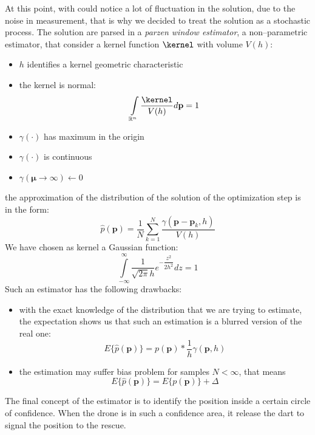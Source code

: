At this point, with could notice a lot of fluctuation in the solution, due to the noise in measurement, that is why we decided to treat the solution as a stochastic process. The solution are parsed in a \emph{parzen window estimator}, a non--parametric estimator, that consider a kernel function $\kernel$ with volume $V(h)$:
\begin{itemize}
\item $h$ identifies a kernel geometric characteristic
\item the kernel is normal: 
\[ \int\limits_{\mathbb{R}^n} \dfrac{\kernel}{V(h)}d\mathbf{p} = 1 \]
\item $\gamma(\cdot)$ has maximum in the origin
\item $\gamma(\cdot)$ is continuous
\item $\gamma(\pmb{\mu}\rightarrow\infty)\leftarrow 0$
\end{itemize}
the approximation of the distribution of the solution of the optimization step is in the form:
\begin{equation}
\hat{p}(\mathbf{p}) = \dfrac{1}{N}\sum\limits_{k=1}^{N} \dfrac{\gamma(\mathbf{p}-\mathbf{p}_k,h)}{V(h)}
\end{equation}
We have chosen as kernel a Gaussian function: 
\[ \int\limits_{-\infty}^{\infty} \dfrac{1}{\sqrt{2\pi} h} e^{-\dfrac{z^2}{2 h^2}} dz = 1 \]
Such an estimator has the following drawbacks:
\begin{itemize}
\item with the exact knowledge of the distribution that we are trying to estimate, the expectation shows us that such an estimation is a blurred version of the real one: \[{E\{\hat{p}(\mathbf{p})\} = p(\mathbf{p}) * \dfrac{1}{h} \gamma(\mathbf{p},h)}\]
\item the estimation may suffer bias problem for samples $N<\infty$, that means \[{E\{\hat{p}(\mathbf{p})\}=E\{{p}(\mathbf{p})\} + \Delta}\]
\end{itemize}

The final concept of the estimator is to identify the position inside a certain circle of confidence. When the drone is in such a confidence area, it release the dart to signal the position to the rescue.